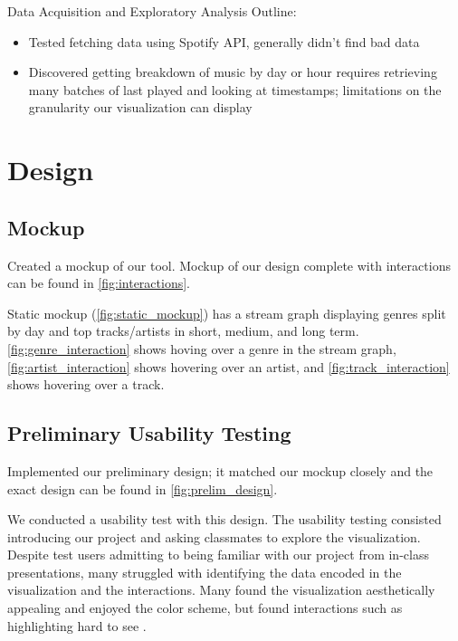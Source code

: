 \documentclass[journal]{vgtc}                %
\begin{document}
Data Acquisition and Exploratory Analysis Outline:
\begin{itemize}
  \item Tested fetching data using Spotify API, generally didn't find bad data
  \item Discovered getting breakdown of music by day or hour requires retrieving many batches of last played and looking at timestamps; limitations on the granularity our visualization can display
\end{itemize}

\section{Design}

\subsection{Mockup}

Created a mockup of our tool.
Mockup of our design complete with interactions can be found in \autoref{fig:interactions}. 



Static mockup (\autoref{fig:static_mockup}) has a stream graph displaying genres split by day and top tracks/artists in short, medium, and long term. \autoref{fig:genre_interaction} shows hoving over a genre in the stream graph, \autoref{fig:artist_interaction} shows hovering over an artist, and \autoref{fig:track_interaction} shows hovering over a track.


\subsection{Preliminary Usability Testing}

Implemented our preliminary design; it matched our mockup closely and the exact design can be found in \autoref{fig:prelim_design}.

We conducted a usability test with this design. The usability testing consisted introducing our project and asking classmates to explore the visualization. Despite test users admitting to being familiar with our project from in-class presentations, many struggled with identifying the data encoded in the visualization and the interactions. Many found the visualization aesthetically appealing and enjoyed the color scheme, but found interactions such as highlighting hard to see .   
\end{document}
